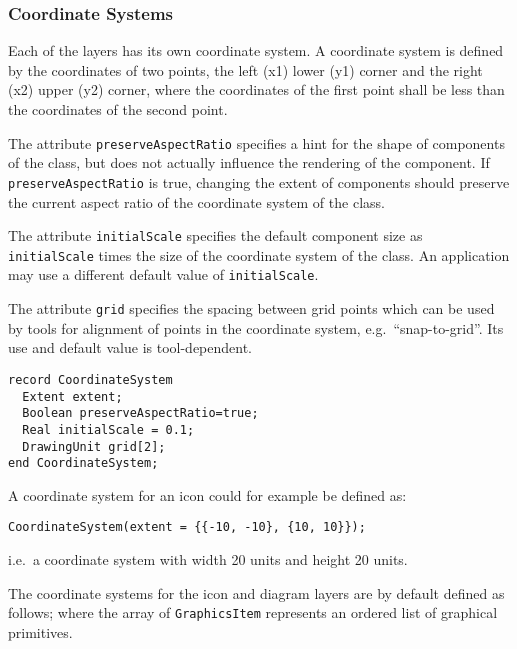 \subsubsection{Coordinate Systems}\label{coordinate-systems}

Each of the layers has its own coordinate system. A coordinate system is
defined by the coordinates of two points, the left (x1) lower (y1)
corner and the right (x2) upper (y2) corner, where the coordinates of
the first point shall be less than the coordinates of the second point.

The attribute \lstinline!preserveAspectRatio! specifies a hint for the shape of
components of the class, but does not actually influence the rendering of the component.
If \lstinline!preserveAspectRatio! is true, changing the
extent of components should preserve the current aspect ratio of the coordinate
system of the class.

The attribute \lstinline!initialScale! specifies the default component size as
\lstinline!initialScale! times the size of the coordinate system of the class. An
application may use a different default value of \lstinline!initialScale!.

The attribute \lstinline!grid! specifies the spacing between grid points which can
be used by tools for alignment of points in the coordinate system, e.g.\ ``snap-to-grid''.
Its use and default value is tool-dependent.

\begin{lstlisting}[language=modelica]
record CoordinateSystem
  Extent extent;
  Boolean preserveAspectRatio=true;
  Real initialScale = 0.1;
  DrawingUnit grid[2];
end CoordinateSystem;
\end{lstlisting}

\begin{example}
A coordinate system for an icon could for example be defined as:
\begin{lstlisting}[language=modelica]
CoordinateSystem(extent = {{-10, -10}, {10, 10}});
\end{lstlisting}
i.e.\ a coordinate system with width 20 units and height 20 units.
\end{example}

The coordinate systems for the icon and diagram layers are by default
defined as follows; where the array of \lstinline!GraphicsItem! represents an
ordered list of graphical primitives.

